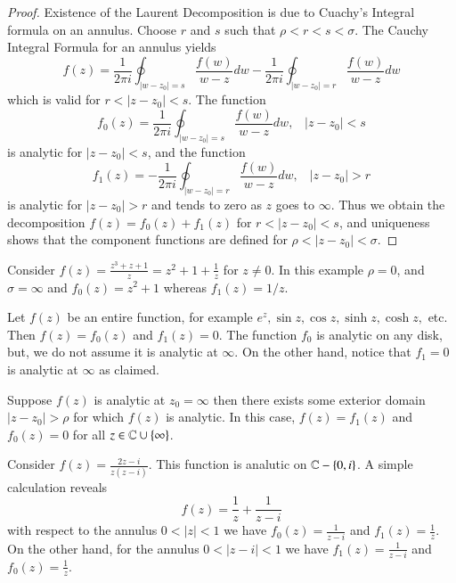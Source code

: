 \begin{proof}
    Existence of the Laurent Decomposition is due to Cuachy's Integral formula on an annulus. Choose $r$ and $s$ such that $\rho < r < s < \sigma$. The Cauchy Integral Formula for an annulus yields \begin{equation*}
        f(z) = \frac{1}{2\pi i}\oint_{|w-z_0|=s}\frac{f(w)}{w-z}dw - \frac{1}{2\pi i}\oint_{|w-z_0| = r}\frac{f(w)}{w-z}dw 
    \end{equation*}
    which is valid for $r < |z-z_0| < s$. The function \begin{equation*}
        f_0(z) = \frac{1}{2\pi i}\oint_{|w-z_0|=s}\frac{f(w)}{w-z}dw,\;\;\;|z-z_0| < s
    \end{equation*}
    is analytic for $|z-z_0| < s$, and the function \begin{equation*}
        f_1(z) = - \frac{1}{2\pi i}\oint_{|w-z_0| = r}\frac{f(w)}{w-z}dw ,\;\;\;|z-z_0| > r
    \end{equation*}
    is analytic for $|z-z_0| > r$ and tends to zero as $z$ goes to $\infty$. Thus we obtain the decomposition $f(z) = f_0(z) + f_1(z)$ for $r < |z-z_0| <s$, and uniqueness shows that the component functions are defined for $\rho < |z-z_0| < \sigma$.
\end{proof}

\begin{example}
    Consider $f(z) = \frac{z^3+z+1}{z} = z^2+1+\frac{1}{z}$ for $z \neq 0$. In this example $\rho = 0$, and $\sigma = \infty$ and $f_0(z) = z^2+1$ whereas $f_1(z) = 1/z$.
\end{example}


\begin{example}
    Let $f(z)$ be an entire function, for example $e^z, \sin z,\cos z, \sinh z,\cosh z,$ etc. Then $f(z) = f_0(z)$ and $f_1(z) = 0$. The function $f_0$ is analytic on any disk, but, we do not assume it is analytic at $\infty$. On the other hand, notice that $f_1 = 0$ is analytic at $\infty$ as claimed.
\end{example}

\begin{example}
    Suppose $f(z)$ is analytic at $z_0 = \infty$ then there exists some exterior domain $|z-z_0| > \rho$ for which $f(z)$ is analytic. In this case, $f(z) = f_1(z)$ and $f_0(z) = 0$ for all $z \in \mathbb C\cup\{\infty\}$.
\end{example}



\begin{example}
    Consider $f(z) = \frac{2z-i}{z(z-i)}$. This function is analutic on $\mathbb C-\{0,i\}$. A simple calculation reveals \begin{equation*}
        f(z) = \frac{1}{z} + \frac{1}{z-i}
    \end{equation*}
    with respect to the annulus $0 < |z| < 1$ we have $f_0(z) = \frac{1}{z-i}$ and $f_1(z) = \frac{1}{z}$. On the other hand, for the annulus $0 < |z-i| < 1$ we have $f_1(z) = \frac{1}{z-i}$ and $f_0(z) = \frac{1}{z}$.
\end{example}


